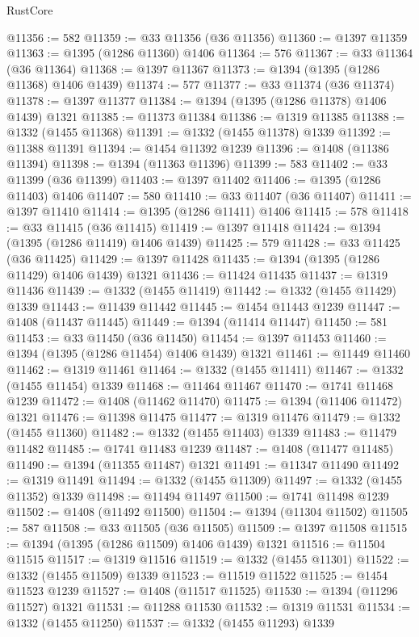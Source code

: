 \begin{lexlean}{RustCore}
\begin{coremodule}
@11356 := 582
@11359 := @33 @11356 (@36 @11356)
@11360 := @1397 @11359
@11363 := @1395 (@1286 @11360) @1406
@11364 := 576
@11367 := @33 @11364 (@36 @11364)
@11368 := @1397 @11367
@11373 := @1394 (@1395 (@1286 @11368) @1406 @1439)
@11374 := 577
@11377 := @33 @11374 (@36 @11374)
@11378 := @1397 @11377
@11384 := @1394 (@1395 (@1286 @11378) @1406 @1439) @1321
@11385 := @11373 @11384
@11386 := @1319 @11385
@11388 := @1332 (@1455 @11368)
@11391 := @1332 (@1455 @11378) @1339
@11392 := @11388 @11391
@11394 := @1454 @11392 @1239
@11396 := @1408 (@11386 @11394)
@11398 := @1394 (@11363 @11396)
@11399 := 583
@11402 := @33 @11399 (@36 @11399)
@11403 := @1397 @11402
@11406 := @1395 (@1286 @11403) @1406
@11407 := 580
@11410 := @33 @11407 (@36 @11407)
@11411 := @1397 @11410
@11414 := @1395 (@1286 @11411) @1406
@11415 := 578
@11418 := @33 @11415 (@36 @11415)
@11419 := @1397 @11418
@11424 := @1394 (@1395 (@1286 @11419) @1406 @1439)
@11425 := 579
@11428 := @33 @11425 (@36 @11425)
@11429 := @1397 @11428
@11435 := @1394 (@1395 (@1286 @11429) @1406 @1439) @1321
@11436 := @11424 @11435
@11437 := @1319 @11436
@11439 := @1332 (@1455 @11419)
@11442 := @1332 (@1455 @11429) @1339
@11443 := @11439 @11442
@11445 := @1454 @11443 @1239
@11447 := @1408 (@11437 @11445)
@11449 := @1394 (@11414 @11447)
@11450 := 581
@11453 := @33 @11450 (@36 @11450)
@11454 := @1397 @11453
@11460 := @1394 (@1395 (@1286 @11454) @1406 @1439) @1321
@11461 := @11449 @11460
@11462 := @1319 @11461
@11464 := @1332 (@1455 @11411)
@11467 := @1332 (@1455 @11454) @1339
@11468 := @11464 @11467
@11470 := @1741 @11468 @1239
@11472 := @1408 (@11462 @11470)
@11475 := @1394 (@11406 @11472) @1321
@11476 := @11398 @11475
@11477 := @1319 @11476
@11479 := @1332 (@1455 @11360)
@11482 := @1332 (@1455 @11403) @1339
@11483 := @11479 @11482
@11485 := @1741 @11483 @1239
@11487 := @1408 (@11477 @11485)
@11490 := @1394 (@11355 @11487) @1321
@11491 := @11347 @11490
@11492 := @1319 @11491
@11494 := @1332 (@1455 @11309)
@11497 := @1332 (@1455 @11352) @1339
@11498 := @11494 @11497
@11500 := @1741 @11498 @1239
@11502 := @1408 (@11492 @11500)
@11504 := @1394 (@11304 @11502)
@11505 := 587
@11508 := @33 @11505 (@36 @11505)
@11509 := @1397 @11508
@11515 := @1394 (@1395 (@1286 @11509) @1406 @1439) @1321
@11516 := @11504 @11515
@11517 := @1319 @11516
@11519 := @1332 (@1455 @11301)
@11522 := @1332 (@1455 @11509) @1339
@11523 := @11519 @11522
@11525 := @1454 @11523 @1239
@11527 := @1408 (@11517 @11525)
@11530 := @1394 (@11296 @11527) @1321
@11531 := @11288 @11530
@11532 := @1319 @11531
@11534 := @1332 (@1455 @11250)
@11537 := @1332 (@1455 @11293) @1339

\end{coremodule}
\end{lexlean}
